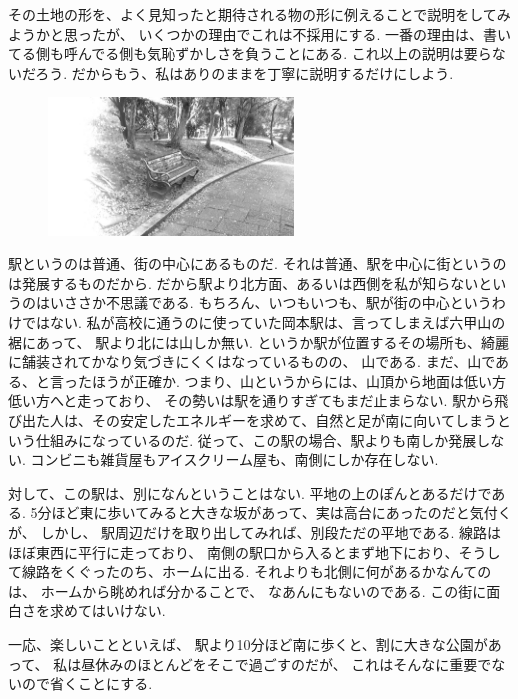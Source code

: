 
その土地の形を、よく見知ったと期待される物の形に例えることで説明をしてみようかと思ったが、
いくつかの理由でこれは不採用にする.
一番の理由は、書いてる側も呼んでる側も気恥ずかしさを負うことにある.
これ以上の説明は要らないだろう.
だからもう、私はありのままを丁寧に説明するだけにしよう.

\begin{figure}
  \hspace*{-.1\textwidth}
\includegraphics[width=0.58\textwidth,bb=0 0 1600 900]{img/park1.jpg}
\end{figure}

駅というのは普通、街の中心にあるものだ.
それは普通、駅を中心に街というのは発展するものだから.
だから駅より北方面、あるいは西側を私が知らないというのはいささか不思議である.
もちろん、いつもいつも、駅が街の中心というわけではない.
私が高校に通うのに使っていた岡本駅は、言ってしまえば六甲山の裾にあって、
駅より北には山しか無い.
というか駅が位置するその場所も、綺麗に舗装されてかなり気づきにくくはなっているものの、
山である.
まだ、山である、と言ったほうが正確か.
つまり、山というからには、山頂から地面は低い方低い方へと走っており、
その勢いは駅を通りすぎてもまだ止まらない.
駅から飛び出た人は、その安定したエネルギーを求めて、自然と足が南に向いてしまうという仕組みになっているのだ.
従って、この駅の場合、駅よりも南しか発展しない.
コンビニも雑貨屋もアイスクリーム屋も、南側にしか存在しない.

対して、この駅は、別になんということはない.
平地の上のぽんとあるだけである.
5分ほど東に歩いてみると大きな坂があって、実は高台にあったのだと気付くが、
しかし、
駅周辺だけを取り出してみれば、別段ただの平地である.
線路はほぼ東西に平行に走っており、
南側の駅口から入るとまず地下におり、そうして線路をくぐったのち、ホームに出る.
それよりも北側に何があるかなんてのは、
ホームから眺めれば分かることで、
なあんにもないのである.
この街に面白さを求めてはいけない.

一応、楽しいことといえば、
駅より10分ほど南に歩くと、割に大きな公園があって、
私は昼休みのほとんどをそこで過ごすのだが、
これはそんなに重要でないので省くことにする.

